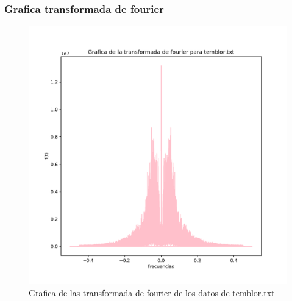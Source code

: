 \documentclass[11pt,letterpaper]{exam}
\begin{document}
\subsubsection{Grafica transformada de fourier}
\begin{figure}[H]
    \centering
    \includegraphics[width=1\textwidth]{Fourier_temblor.pdf}
    \caption{Grafica de las transformada de fourier de los datos de temblor.txt}
    \label{fig:my_label}

\end{figure}
\end{document}
